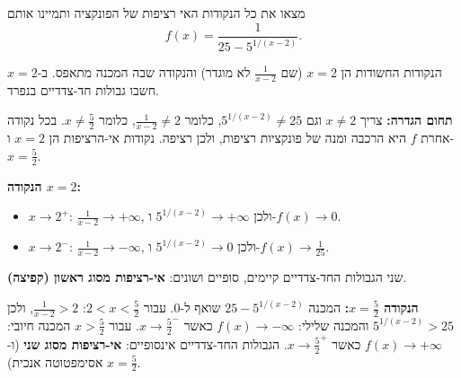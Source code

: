 
\begin{question}
מצאו את כל הנקודות האי רציפות של הפונקציה ותמיינו אותם
\[
f(x)=\frac{1}{25-5^{1/(x-2)}}.
\]
\end{question}

\begin{hint}
הנקודות החשודות הן $x=2$ (שם $\frac1{x-2}$ לא מוגדר) והנקודה שבה המכנה מתאפס. ב-$x=2$ חשבו גבולות חד-צדדיים בנפרד.
\end{hint}

\begin{solution}
\textbf{תחום הגדרה:} צריך $x\neq2$ וגם $5^{1/(x-2)}\neq25$, כלומר $\frac1{x-2}\neq2$, כלומר $x\neq\frac52$. בכל נקודה אחרת $f$ היא הרכבה ומנה של פונקציות רציפות, ולכן רציפה. נקודות אי-הרציפות הן $x=2$ ו-$x=\frac52$.

\textbf{הנקודה $x=2$:}
\begin{itemize}
  \item $x\to2^+$: $\frac1{x-2}\to+\infty$, ולכן $5^{1/(x-2)}\to+\infty$ ו-$f(x)\to0$.
  \item $x\to2^-$: $\frac1{x-2}\to-\infty$, ולכן $5^{1/(x-2)}\to0$ ו-$f(x)\to\frac1{25}$.
\end{itemize}
שני הגבולות החד-צדדיים קיימים, סופיים ושונים: \textbf{אי-רציפות מסוג ראשון (קפיצה)}.

\textbf{הנקודה $x=\frac52$:} המכנה $25-5^{1/(x-2)}$ שואף ל-$0$. עבור $2<x<\frac52$: $\frac1{x-2}>2$, ולכן $5^{1/(x-2)}>25$ והמכנה שלילי: $f(x)\to-\infty$ כאשר $x\to\frac52^-$. עבור $x>\frac52$ המכנה חיובי: $f(x)\to+\infty$ כאשר $x\to\frac52^+$. הגבולות החד-צדדיים אינסופיים: \textbf{אי-רציפות מסוג שני} (ו-$x=\frac52$ אסימפטוטה אנכית).
\end{solution}
